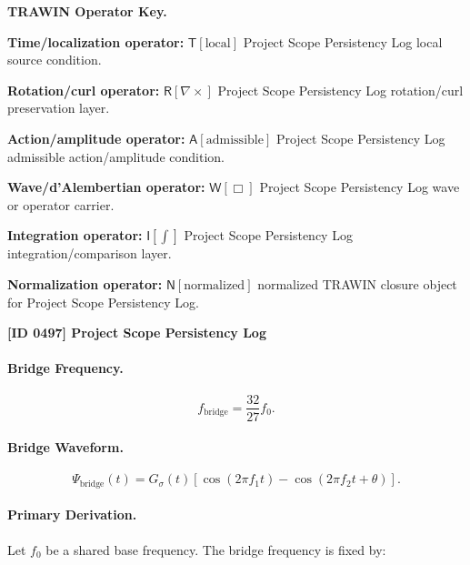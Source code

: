\par\vspace{0.45\baselineskip}
\noindent\begin{minipage}[t]{\linewidth}
\begingroup
\small
\raggedright
\textbf{TRAWIN Operator Key.}\par
\noindent\textbf{Time/localization operator:} $\mathsf{T}\!\left[\mathrm{local}\right]$ Project Scope Persistency Log local source condition.\par
\noindent\textbf{Rotation/curl operator:} $\mathsf{R}\!\left[\nabla\times\right]$ Project Scope Persistency Log rotation/curl preservation layer.\par
\noindent\textbf{Action/amplitude operator:} $\mathsf{A}\!\left[\mathrm{admissible}\right]$ Project Scope Persistency Log admissible action/amplitude condition.\par
\noindent\textbf{Wave/d'Alembertian operator:} $\mathsf{W}\!\left[\Box\right]$ Project Scope Persistency Log wave or operator carrier.\par
\noindent\textbf{Integration operator:} $\mathsf{I}\!\left[\int\right]$ Project Scope Persistency Log integration/comparison layer.\par
\noindent\textbf{Normalization operator:} $\mathsf{N}\!\left[\mathrm{normalized}\right]$ normalized TRAWIN closure object for Project Scope Persistency Log.\par
\endgroup
\end{minipage}

\clearpage
\noindent\textbf{[ID 0497] Project Scope Persistency Log}\par
\vspace{0.35em}
\paragraph{Bridge Frequency.}
\begin{equation}
f_{\mathrm{bridge}}=\frac{32}{27}f_0.
\end{equation}

\paragraph{Bridge Waveform.}
\begin{equation}
\Psi_{\mathrm{bridge}}(t)
=
G_{\sigma}(t)
\left[
\cos(2\pi f_1t)
-
\cos(2\pi f_2t+\theta)
\right].
\end{equation}

\paragraph{Primary Derivation.}
Let $f_0$ be a shared base frequency.  
The bridge frequency is fixed by:

